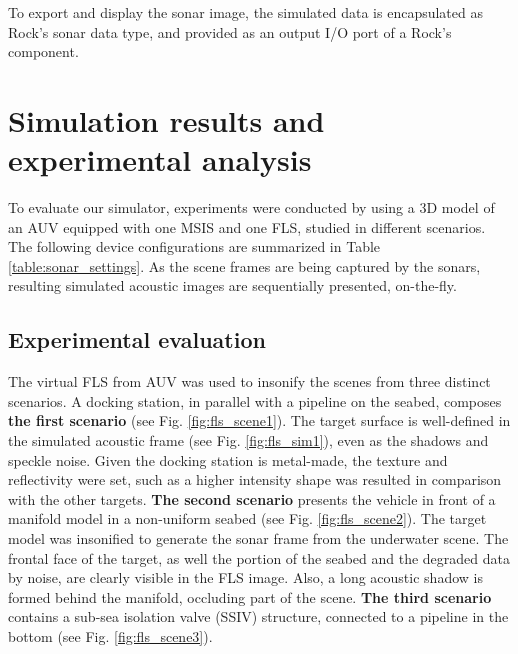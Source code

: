 \documentclass[final,5p,times]{elsarticle}
\begin{document}
To export and display the sonar image, the simulated data is encapsulated
as Rock's sonar data type, and provided as an output I/O port of a Rock's
component.


\section{Simulation results and experimental analysis}
\label{results}

To evaluate our simulator, experiments were conducted by using a 3D model
of an AUV equipped with one MSIS and one FLS, studied in different scenarios.
The following device configurations are summarized in
Table \ref{table:sonar_settings}. As the scene frames are being captured by
the sonars, resulting simulated acoustic images are sequentially presented,
on-the-fly.

\subsection{Experimental evaluation}

The virtual FLS from AUV was used to insonify the scenes from three distinct
scenarios. A docking station, in parallel with a pipeline on the seabed,
composes \textbf{the first scenario} (see Fig. \ref{fig:fls_scene1}). The
target surface is well-defined in the simulated acoustic frame (see
Fig. \ref{fig:fls_sim1}), even as the shadows and speckle noise. Given the
docking station is metal-made, the texture and reflectivity were set, such
as a higher intensity shape was resulted in comparison with the other targets.
\textbf{The second scenario} presents the vehicle in front of a manifold model
in a non-uniform seabed (see Fig. \ref{fig:fls_scene2}). The target model was
insonified to generate the sonar frame from the underwater scene. The frontal
face of the target, as well the portion of the seabed and the degraded data
by noise, are clearly visible in the FLS image. Also, a long acoustic shadow
is formed behind the manifold, occluding part of the scene. \textbf{The
third scenario} contains a sub-sea isolation valve (SSIV) structure, connected
to a pipeline in the bottom (see Fig. \ref{fig:fls_scene3}).
\end{document}
